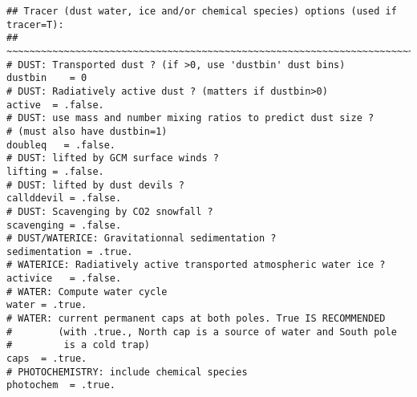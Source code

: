 {\footnotesize

\begin{verbatim}                                                                               
## Tracer (dust water, ice and/or chemical species) options (used if tracer=T):
## ~~~~~~~~~~~~~~~~~~~~~~~~~~~~~~~~~~~~~~~~~~~~~~~~~~~~~~~~~~~~~~~~~~~~~~~~~~~
# DUST: Transported dust ? (if >0, use 'dustbin' dust bins)
dustbin    = 0
# DUST: Radiatively active dust ? (matters if dustbin>0)
active  = .false.
# DUST: use mass and number mixing ratios to predict dust size ?
# (must also have dustbin=1)
doubleq   = .false.
# DUST: lifted by GCM surface winds ?
lifting = .false.
# DUST: lifted by dust devils ?
callddevil = .false.
# DUST: Scavenging by CO2 snowfall ?
scavenging = .false.
# DUST/WATERICE: Gravitationnal sedimentation ?
sedimentation = .true.
# WATERICE: Radiatively active transported atmospheric water ice ?
activice   = .false.
# WATER: Compute water cycle
water = .true.
# WATER: current permanent caps at both poles. True IS RECOMMENDED
#        (with .true., North cap is a source of water and South pole
#         is a cold trap)
caps  = .true.
# PHOTOCHEMISTRY: include chemical species 
photochem  = .true.
\end{verbatim}
}
